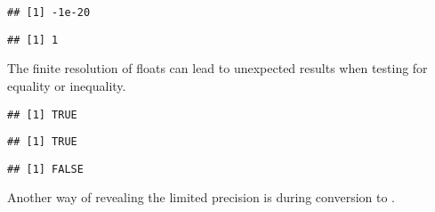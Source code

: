 \documentclass[krantz2]{krantz}\usepackage{knitr}
\begin{document}
\begin{explainbox}
\begin{knitrout}\footnotesize
{}\color{fgcolor}\begin{kframe}
\begin{alltt}
 \hlopt{-} 
\end{alltt}
\begin{verbatim}
## [1] -1e-20
\end{verbatim}
\begin{alltt}
 \hlopt{-} 
\end{alltt}
\begin{verbatim}
## [1] 1
\end{verbatim}
\end{kframe}
\end{knitrout}

The finite resolution of floats can lead to unexpected results when testing for equality or inequality.

\begin{knitrout}\footnotesize
{}\color{fgcolor}\begin{kframe}
\begin{alltt}
 \hlopt{==}  \hlopt{+} 
\end{alltt}
\begin{verbatim}
## [1] TRUE
\end{verbatim}
\begin{alltt}
 \hlopt{==}  \hlopt{+} 
\end{alltt}
\begin{verbatim}
## [1] TRUE
\end{verbatim}
\begin{alltt}
 \hlopt{==} 
\end{alltt}
\begin{verbatim}
## [1] FALSE
\end{verbatim}
\end{kframe}
\end{knitrout}

Another way of revealing the limited precision is during conversion to .


\end{explainbox}
\end{document}
